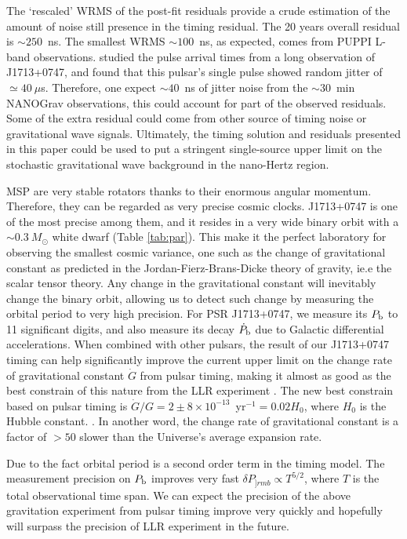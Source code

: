 The `rescaled' WRMS of the post-fit residuals provide a crude estimation of
the amount of noise still presence in the timing residual. The 20 years
overall residual is $\sim 250$~ns. The smallest WRMS $\sim100$~ns, as expected,
comes from PUPPI L-band observations.
\citet{sc12} studied the pulse arrival times from a long observation of J1713+0747, and found that this pulsar's single pulse showed random jitter of $\simeq40~\mu$s. Therefore, one expect $\sim 40$~ns of jitter noise from the $\sim30$~min NANOGrav observations, this could account for part of the observed residuals.
Some of the extra residual could come from other source of timing noise or gravitational wave signals.
Ultimately, the timing solution and residuals presented in this paper could be used to put a stringent single-source upper limit on the stochastic gravitational wave background in the nano-Hertz region.

MSP are very stable rotators thanks to their enormous angular momentum.
Therefore, they can be regarded as very precise cosmic clocks. J1713+0747 is one of
the most precise among them, and it resides in a very wide binary orbit
with a $\sim0.3~M_{\odot}$ white dwarf (Table \ref{tab:par}). This make it the
perfect laboratory for observing the smallest cosmic variance, one such as the
change of gravitational constant as predicted in the Jordan-Fierz-Brans-Dicke
theory of gravity, ie.e the scalar tensor theory. Any change in the
gravitational constant will inevitably change the binary orbit, allowing us
to detect such change by measuring the orbital period to very high precision. 
For PSR J1713+0747, we measure its $P_{\rm b}$ to 11 significant
digits, and also measure its decay $\dot{P}_{\rm b}$ due to Galactic differential accelerations.
When combined with other pulsars, the result of our J1713+0747 timing can help
significantly improve the current upper limit on the change rate of gravitational
 constant $\dot{G}$ from pulsar timing, making it almost as good as the best
constrain of this nature from the LLR experiment \citep{hmb10}.
The new best constrain based on pulsar timing is $\dot{G}/G
=2\pm8\times10^{-13}$~yr$^{-1}=0.02H_0$, where $H_0$ is the Hubble constant. . 
In another word, the change rate of gravitational constant is a factor of $>50$
slower than the Universe's average expansion rate.

Due to the fact orbital period is a second order term in the timing 
model. The measurement precision on $P_{\rm b}$ improves very fast $\delta
P_{]rm b} \propto T^{5/2}$, where $T$ is the total observational time span.
We can expect the precision of the above gravitation experiment from pulsar
timing improve very quickly and hopefully will surpass the precision of LLR
experiment in the future.
